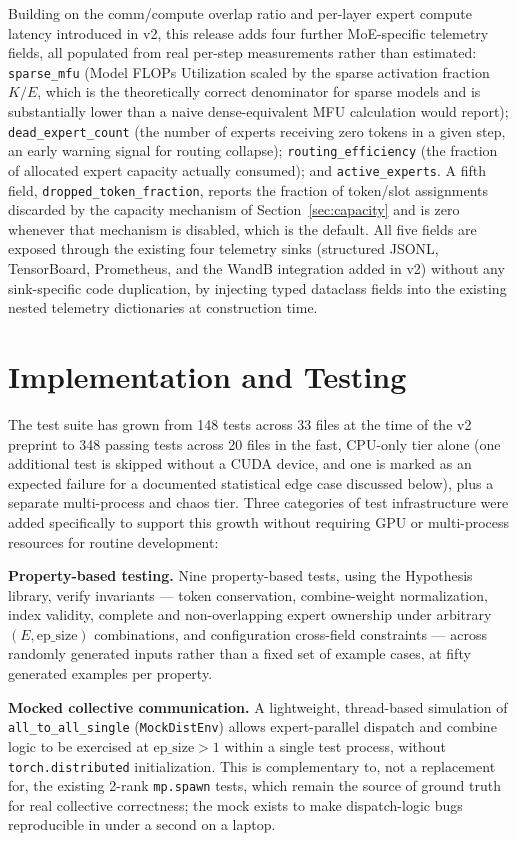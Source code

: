 \documentclass[11pt]{article}
\begin{document}
Building on the comm/compute overlap ratio and per-layer expert compute
latency introduced in v2, this release adds four further MoE-specific
telemetry fields, all populated from real per-step measurements rather
than estimated: \texttt{sparse\_mfu} (Model FLOPs Utilization scaled by the
sparse activation fraction $K/E$, which is the theoretically correct
denominator for sparse models and is substantially lower than a naive
dense-equivalent MFU calculation would report); \texttt{dead\_expert\_count}
(the number of experts receiving zero tokens in a given step, an early
warning signal for routing collapse); \texttt{routing\_efficiency} (the
fraction of allocated expert capacity actually consumed); and
\texttt{active\_experts}. A fifth field, \texttt{dropped\_token\_fraction},
reports the fraction of token/slot assignments discarded by the capacity
mechanism of Section~\ref{sec:capacity} and is zero whenever that mechanism
is disabled, which is the default. All five fields are exposed through the
existing four telemetry sinks (structured JSONL, TensorBoard, Prometheus,
and the WandB integration added in v2) without any sink-specific code
duplication, by injecting typed dataclass fields into the existing nested
telemetry dictionaries at construction time.

\section{Implementation and Testing}

The test suite has grown from 148 tests across 33 files at the time of the
v2 preprint to 348 passing tests across 20 files in the fast, CPU-only
tier alone (one additional test is skipped without a CUDA device, and one
is marked as an expected failure for a documented statistical edge case
discussed below), plus a separate multi-process and chaos tier. Three
categories of test infrastructure were added specifically to support this
growth without requiring GPU or multi-process resources for routine
development:

\textbf{Property-based testing.} Nine property-based tests, using the
Hypothesis library, verify invariants --- token conservation, combine-weight
normalization, index validity, complete and non-overlapping expert
ownership under arbitrary $(E, \mathrm{ep\_size})$ combinations, and
configuration cross-field constraints --- across randomly generated inputs
rather than a fixed set of example cases, at fifty generated examples per
property.

\textbf{Mocked collective communication.} A lightweight, thread-based
simulation of \texttt{all\_to\_all\_single} (\texttt{MockDistEnv}) allows
expert-parallel dispatch and combine logic to be exercised at
$\mathrm{ep\_size} > 1$ within a single test process, without
\texttt{torch.distributed} initialization. This is complementary to, not a
replacement for, the existing 2-rank \texttt{mp.spawn} tests, which remain
the source of ground truth for real collective correctness; the mock
exists to make dispatch-logic bugs reproducible in under a second on a
laptop.
\end{document}
